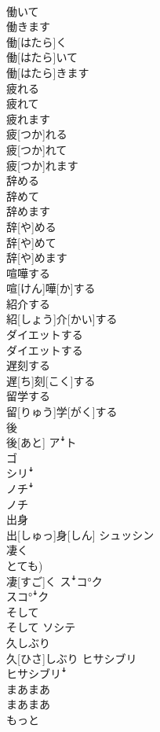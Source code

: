 \documentclass[8pt]{extreport}
\begin{document}
\begin{CJK}{UTF8}{min}
\\	働いて 
\\	働きます	
\\	働[はたら]く 
\\	働[はたら]いて 
\\	働[はたら]きます	
\\	疲れる 
\\	疲れて 
\\	疲れます	
\\	疲[つか]れる 
\\	疲[つか]れて 
\\	疲[つか]れます	
\\	辞める 
\\	辞めて 
\\	辞めます	
\\	辞[や]める 
\\	辞[や]めて 
\\	辞[や]めます	
\\	喧嘩する	
\\	喧[けん]嘩[か]する	
\\	紹介する	
\\	紹[しょう]介[かい]する	
\\	ダイエットする	
\\	ダイエットする	
\\	遅刻する	
\\	遅[ち]刻[こく]する	
\\	留学する	
\\	留[りゅう]学[がく]する	
\\	後	
\\	後[あと]	アꜜト 
\\	ゴ 
\\	シリꜜ 
\\	ノチꜜ 
\\	ノチ
\\	出身	
\\	出[しゅっ]身[しん]	シュッシン
\\	凄く	
\\	とても) 
\\	凄[すご]く	スꜜコ°ク 
\\	スコ°ꜜク
\\	そして	
\\	そして	ソシテ
\\	久しぶり	
\\	久[ひさ]しぶり	ヒサシブリ 
\\	ヒサシブリꜜ
\\	まあまあ	
\\	まあまあ	
\\	もっと	

\end{CJK}
\end{document}
